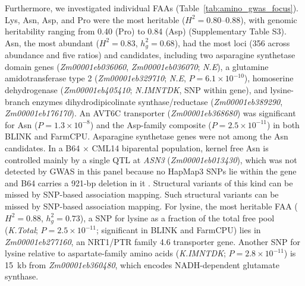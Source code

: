 Furthermore, we investigated individual FAAs (Table~\ref{tab:amino_gwas_focus}). Lys, Asn, Asp, and Pro were the most heritable ($H^2=0.80$--$0.88$), with genomic heritability ranging from 0.40 (Pro) to 0.84 (Asp) (Supplementary Table S3). Asn, the most abundant ($H^2=0.83$, $h^2_g=0.68$), had the most loci (356 across abundance and five ratios) and candidates, including two asparagine synthetase domain genes (\textit{Zm00001eb036060}, \textit{Zm00001eb036070}; \textit{N.E}), a glutamine amidotransferase type 2 (\textit{Zm00001eb329710}; \textit{N.E}, $P=6.1\times10^{-10}$), homoserine dehydrogenase (\textit{Zm00001eb405410}; \textit{N.IMNTDK}, SNP within gene), and lysine-branch enzymes dihydrodipicolinate synthase/reductase (\textit{Zm00001eb389290}, \textit{Zm00001eb176170}). An AVT6C transporter (\textit{Zm00001eb368680}) was significant for Asn ($P=1.3\times10^{-8}$) and the Asp-family composite ($P=2.5\times10^{-11}$) in both BLINK and FarmCPU. Asparagine synthetase genes were not among the Asn candidates. In a B64 $\times$ CML14 biparental population, kernel free Asn is controlled mainly by a single QTL at \textit{ASN3} (\textit{Zm00001eb013430}), which was not detected by GWAS in this panel because no HapMap3 SNPs lie within the gene and B64 carries a 921-bp deletion in it \citep{Fitzsimmons2026KernelKitchen}. Structural variants of this kind can be missed by SNP-based association mapping.  Such structural variants can be missed by SNP-based association mapping. For lysine, the most heritable FAA ($H^2 = 0.88$, $h^2_g = 0.73$), a SNP for lysine as a fraction of the total free pool (\textit{K.Total}; $P = 2.5 \times 10^{-11}$; significant in BLINK and FarmCPU) lies in \textit{Zm00001eb277160}, an NRT1/PTR family 4.6 transporter gene. Another SNP for lysine relative to aspartate-family amino acids (\textit{K.IMNTDK}; $P = 2.8 \times 10^{-11}$) is 15~kb from \textit{Zm00001eb360480}, which encodes NADH-dependent glutamate synthase.

